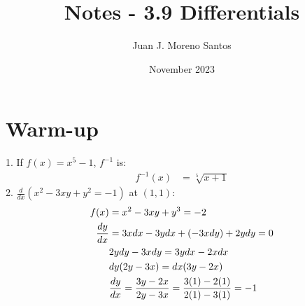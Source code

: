 \documentclass[11pt]{article}
\title{Notes - 3.9 Differentials}
\author{Juan J. Moreno Santos}
\date{November 2023}
\newcommand*{\set}{\setcounter{equation}{0}}
\begin{document}
\maketitle

\section{Warm-up}
1. If $f(x)=x^5-1$, $f^{-1}$ is:
\begin{align}
    f^{-1}(x)&=\sqrt[5]{x+1}
\end{align}
2. $\frac{d}{dx}(x^2-3xy+y^2=-1)$ at $(1, 1)$:
\begin{align}
    \set
    f(x)&=x^2-3xy+y^3=-2\\
    \frac{dy}{dx}&=3xdx-3ydx+(-3xdy)+2ydy=0\\
    &2ydy-3xdy=3ydx-2xdx\\
    &dy(2y-3x)=dx(3y-2x)\\
    &\frac{dy}{dx}=\frac{3y-2x}{2y-3x}=\frac{3(1)-2(1)}{2(1)-3(1)}=-1
\end{align}
\end{document}
